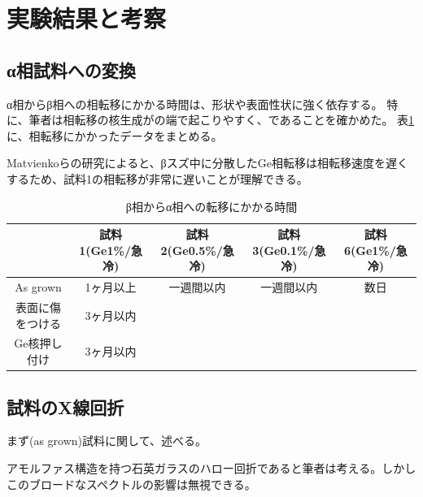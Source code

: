 \section{実験結果と考察}

\subsection{α相試料への変換}

α相からβ相への相転移にかかる時間は、形状や表面性状に強く依存する。\cite{Matvienko}
特に、筆者は相転移の核生成がの端で起こりやすく、であることを確かめた。
表\ref{tab:trans_Time}に、相転移にかかったデータをまとめる。

Matvienkoらの研究\cite{Matvienko}によると、βスズ中に分散したGe相転移は相転移速度を遅くするため、試料1の相転移が非常に遅いことが理解できる。

\begin{table}[htb]
    \begin{center}
  \begin{tabular}{c|cccc}
    & 試料1(Ge1\%/急冷) & 試料2(Ge0.5\%/急冷) & 試料3(Ge0.1\%/急冷)& 試料6(Ge1\%/急冷) \\ \hline
    As grown & 1ヶ月以上　& 一週間以内 & 一週間以内 & 数日 \\
    表面に傷をつける & 3ヶ月以内 & && \\
    Ge核押し付け& 3ヶ月以内　& & &  \\
  \end{tabular}
  \caption{β相からα相への転移にかかる時間}
  \label{tab:trans_Time}
    \end{center}
\end{table}


\subsection{試料のX線回折}
まず(as grown)試料に関して、述べる。


アモルファス構造を持つ石英ガラスのハロー回折であると筆者は考える。しかしこのブロードなスペクトルの影響は無視できる。

